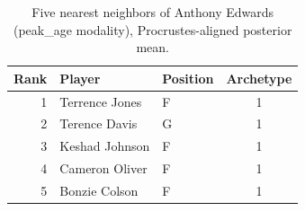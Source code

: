 \begin{table}[htbp]
  \centering\small
  \begin{tabular}{rllc}
    \toprule
    Rank & Player & Position & Archetype \\
    \midrule
    1 & Terrence Jones & F & 1 \\
    2 & Terence Davis & G & 1 \\
    3 & Keshad Johnson & F & 1 \\
    4 & Cameron Oliver & F & 1 \\
    5 & Bonzie Colson & F & 1 \\
    \bottomrule
  \end{tabular}
  \caption{Five nearest neighbors of Anthony Edwards (peak_age modality), Procrustes-aligned posterior mean.}
  \label{tab:Anthony_Edwards_neighbors_peak_age}
\end{table}

